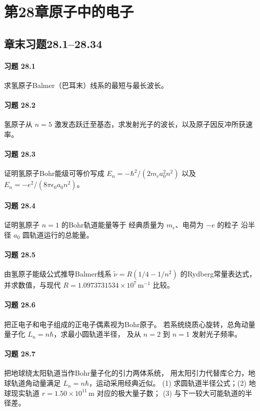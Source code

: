 \section*{第28章\quad 原子中的电子}
\subsection*{章末习题28.1--28.34}
\paragraph{习题 28.1}
求氢原子Balmer（巴耳末）线系的最短与最长波长。
\paragraph{习题 28.2}
氢原子从 \(n=5\) 激发态跃迁至基态，求发射光子的波长，以及原子因反冲所获速率。
\paragraph{习题 28.3}
证明氢原子Bohr能级可等价写成
\(E_n=-\hbar^2/(2m_ea_0^2n^2)\)
以及 \(E_n=-e^2/(8\pi\epsilon_0a_0n^2)\)。
\paragraph{习题 28.4}
证明氢原子 \(n=1\) 的Bohr轨道能量等于
经典质量为 \(m_e\)、电荷为 \(-e\) 的粒子
沿半径 \(a_0\) 圆轨道运行的总能量。
\paragraph{习题 28.5}
由氢原子能级公式推导Balmer线系
\(\widetilde\nu=R(1/4-1/n^2)\)
的Rydberg常量表达式，并求数值，与现代
\(R=1.0973731534\times10^7\,\mathrm{m^{-1}}\) 比较。
\paragraph{习题 28.6}
把正电子和电子组成的正电子偶素视为Bohr原子。
若系统绕质心旋转，总角动量量子化
\(L_n=n\hbar\)，求最小圆轨道半径，
及从 \(n=2\) 到 \(n=1\) 发射光子频率。
\paragraph{习题 28.7}
把地球绕太阳轨道当作Bohr量子化的引力两体系统，
用太阳引力代替库仑力，地球轨道角动量满足
\(L_n=n\hbar\)，运动采用经典近似。
(1) 求圆轨道半径公式；(2) 地球现实轨道
\(r=1.50\times10^{11}\,\mathrm m\) 对应的极大量子数；
(3) 与下一较大可能轨道的半径差。
